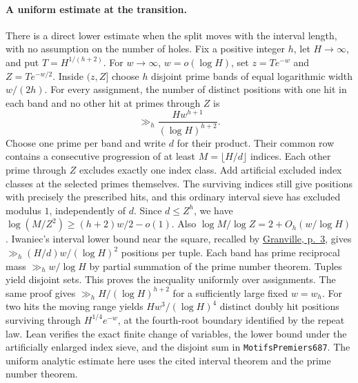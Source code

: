\documentclass[11pt]{article}
\begin{document}
\paragraph{A uniform estimate at the transition.}
There is a direct lower estimate when the split moves with the
interval length, with no assumption on the number of holes. Fix a
positive integer $h$, let $H\to\infty$, and put $T=H^{1/(h+2)}$.
For $w\to\infty$, $w=o(\log H)$, set $z=T e^{-w}$ and $Z=T e^{-w/2}$.
Inside $(z,Z]$ choose $h$ disjoint prime bands of equal logarithmic
width $w/(2h)$. For every assignment, the number of distinct positions
with one hit in each band and no other hit at primes through $Z$ is
\[
                   \gg_h \frac{H w^{h+1}}{(\log H)^{h+2}} .
\]
Choose one prime per band and write $d$ for their product. Their
common row contains a consecutive progression of at least
$M=\lfloor H/d\rfloor$ indices. Each other prime through $Z$
excludes exactly one index class. Add artificial excluded index
classes at the selected primes themselves. The surviving indices
still give positions with precisely the prescribed hits, and this
ordinary interval sieve has excluded modulus $1$, independently of
$d$. Since $d\le Z^h$, we have
$\log(M/Z^2)\ge(h+2)w/2-o(1)$. Also
$\log M/\log Z=2+O_h(w/\log H)$. Iwaniec's interval lower bound
near the square, recalled by
\href{https://arxiv.org/pdf/2010.01211}{Granville, p.~3},
gives $\gg_h (H/d)w/(\log H)^2$ positions per tuple. Each band has
prime reciprocal mass $\gg_h w/\log H$ by partial summation of the
prime number theorem. Tuples yield disjoint sets. This proves the
inequality uniformly over assignments. The same proof gives
$\gg_h H/(\log H)^{h+2}$ for a sufficiently large fixed $w=w_h$.
For two hits the moving range yields $H w^3/(\log H)^4$ distinct
doubly hit positions surviving through $H^{1/4}e^{-w}$, at the
fourth-root boundary identified by the repeat law.
Lean verifies the exact finite change of variables, the lower
bound under the artificially enlarged index sieve, and the disjoint
sum in \texttt{MotifsPremiers687}. The uniform analytic estimate here
uses the cited interval theorem and the prime number theorem.
\end{document}
